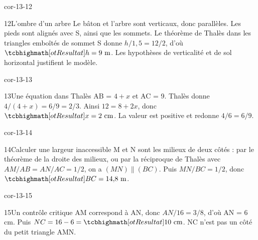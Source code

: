 \begin{blocLivre}{cor-13-12}\begin{corrige}{12}{L’ombre d’un arbre}
Le bâton et l’arbre sont verticaux, donc parallèles. Les pieds sont alignés avec S, ainsi que les sommets. Le théorème de Thalès dans les triangles emboîtés de sommet S donne $h/1{,}5=12/2$, d’où $\res{h=9\text{ m}}$. Les hypothèses de verticalité et de sol horizontal justifient le modèle.
\label{fig-cor-13-12}
\end{corrige}\end{blocLivre}
\begin{blocLivre}{cor-13-13}\begin{corrige}{13}{Une équation dans Thalès}
AB = $4+x$ et AC = 9. Thalès donne $4/(4+x)=6/9=2/3$. Ainsi $12=8+2x$, donc $\res{x=2\text{ cm}}$. La valeur est positive et redonne $4/6=6/9$.
\label{fig-cor-13-13}
\end{corrige}\end{blocLivre}
\begin{blocLivre}{cor-13-14}\begin{corrige}{14}{Calculer une largeur inaccessible}
M et N sont les milieux de deux côtés : par le théorème de la droite des milieux, ou par la réciproque de Thalès avec $AM/AB=AN/AC=1/2$, on a $(MN)\parallel(BC)$. Puis $MN/BC=1/2$, donc $\res{BC=14{,}8\text{ m}}$.
\label{fig-cor-13-14}
\end{corrige}\end{blocLivre}
\begin{blocLivre}{cor-13-15}\begin{corrige}{15}{Un contrôle critique}
AM correspond à AN, donc $AN/16=3/8$, d’où AN = 6 cm. Puis $NC=16-6=\res{10\text{ cm}}$. NC n’est pas un côté du petit triangle AMN.
\label{fig-cor-13-15}
\end{corrige}\end{blocLivre}
